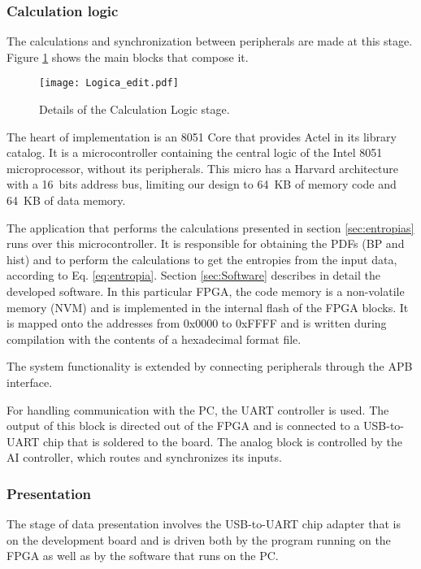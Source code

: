 \subsubsection{Calculation logic}
%
The calculations and synchronization between peripherals are made at this stage. Figure \ref{fig:logica} shows the main blocks that compose it.

\begin{figure}
 \centering
 \texttt{[image: Logica\_edit.pdf]}\\
 \caption{Details of the Calculation Logic stage.}\label{fig:logica}
\end{figure}

The heart of implementation is an 8051 Core that provides  Actel in its library catalog. It is a microcontroller containing the central logic of the Intel 8051 microprocessor, without its peripherals.
This micro has a Harvard architecture with a 16~bits address bus, limiting our design to 64~KB of memory code and 64~KB of data memory.

The application that performs the calculations presented in section \ref{sec:entropias} runs over this microcontroller.
It is responsible for obtaining the PDFs (BP and hist) and to perform the calculations to get the entropies from the input data, according to Eq. \ref{eq:entropia}. Section \ref{sec:Software} describes in detail the developed software.
In this particular FPGA, the code memory is a non-volatile memory (NVM) and is implemented in the internal flash of the FPGA blocks. It is mapped onto the addresses from 0x0000 to 0xFFFF and is written  during compilation with the contents of a hexadecimal format file.

The system functionality is extended by connecting peripherals through the APB interface.

For handling communication with the PC, the UART controller is used. The output of this block is directed out of the FPGA and is connected to a USB-to-UART chip that is soldered to the board.
The analog block is controlled by the AI controller, which routes and synchronizes its inputs.

%
\subsubsection{Presentation}
The stage of data presentation involves the USB-to-UART chip adapter that is on the development board and is driven both by the program running on the FPGA as well as by the software that runs on the PC. 

